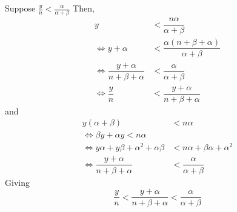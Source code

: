 \documentclass[12pt]{article}\usepackage[]{graphicx}\usepackage[]{color}
\begin{document}
\begin{enumerate}
\begin{enumerate}[label = (\alph*), start = 2]
Suppose $\frac{y}{n} < \frac{\alpha}{\alpha + \beta}$
Then,
\begin{align*}
y &< \dfrac{n \alpha}{\alpha + \beta}\\
\Longleftrightarrow y + \alpha &< \dfrac{ \alpha ( n + \beta + \alpha)}{\alpha + \beta}\\
\Longleftrightarrow \dfrac{y + \alpha}{n + \beta + \alpha} &< \dfrac{\alpha}{\alpha + \beta}\\
\Longleftrightarrow \dfrac{y}{n} &< \dfrac{y + \alpha}{n + \beta + \alpha}
\end{align*}
and
\begin{align*}
y(\alpha + \beta) &< n \alpha \\
\Longleftrightarrow \beta y + \alpha y < n \alpha \\
\Longleftrightarrow y \alpha + y \beta + \alpha^2 + \alpha \beta & < n \alpha + \beta \alpha + \alpha^2 \\
\Longleftrightarrow \dfrac{y + \alpha}{n + \beta + \alpha} &< \dfrac{\alpha}{\alpha + \beta}
\end{align*}
Giving
\[ \dfrac{y}{n} < \dfrac{y + \alpha}{n + \beta + \alpha} <  \dfrac{\alpha}{\alpha + \beta} \]


\end{enumerate}
\end{enumerate}
\end{document}

